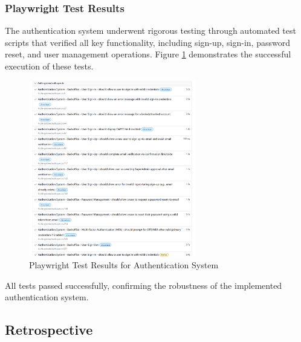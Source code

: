 \subsubsection{Playwright Test Results}
The authentication system underwent rigorous testing through automated test scripts that verified all key functionality, including sign-up, sign-in, password reset, and user management operations. Figure \ref{fig:playwright-tests} demonstrates the successful execution of these tests.
\begin{figure}[htbp]
    \centering
    \includegraphics[width=0.65\textwidth]{images/playwright-test-results.png}
    \caption{Playwright Test Results for Authentication System}
    \label{fig:playwright-tests}
\end{figure}


All tests passed successfully, confirming the robustness of the implemented authentication system.
\newpage
\subsection{Retrospective}

